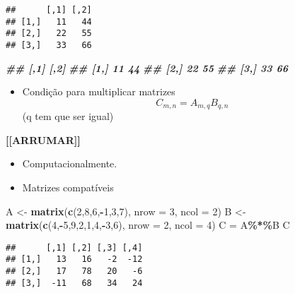 \documentclass[
]{article}
\newenvironment{Shaded}{\begin{snugshade}}{\end{snugshade}}
\newcommand{\AttributeTok}[1]{\textcolor[rgb]{0.13,0.29,0.53}{#1}}
\newcommand{\DecValTok}[1]{\textcolor[rgb]{0.00,0.00,0.81}{#1}}
\newcommand{\DocumentationTok}[1]{\textcolor[rgb]{0.56,0.35,0.01}{\textbf{\textit{#1}}}}
\newcommand{\FunctionTok}[1]{\textcolor[rgb]{0.13,0.29,0.53}{\textbf{#1}}}
\newcommand{\NormalTok}[1]{#1}
\newcommand{\OtherTok}[1]{\textcolor[rgb]{0.56,0.35,0.01}{#1}}
\newcommand{\SpecialCharTok}[1]{\textcolor[rgb]{0.81,0.36,0.00}{\textbf{#1}}}
\providecommand{\tightlist}{%
  \setlength{\itemsep}{0pt}\setlength{\parskip}{0pt}}
\begin{document}
\begin{verbatim}
##      [,1] [,2]
## [1,]   11   44
## [2,]   22   55
## [3,]   33   66
\end{verbatim}

\begin{Shaded}
\begin{Highlighting}[]
\DocumentationTok{\#\# [,1] [,2]}
\DocumentationTok{\#\# [1,] 11 44}
\DocumentationTok{\#\# [2,] 22 55}
\DocumentationTok{\#\# [3,] 33 66}
\end{Highlighting}
\end{Shaded}

\begin{itemize}
\tightlist
\item
  Condição para multiplicar matrizes \[
  C_{m, n} = A_{m,q} B_{q,n}
  \] (q tem que ser igual)
\end{itemize}

\textbf{{[}{[}ARRUMAR{]}{]}}

\begin{itemize}
\tightlist
\item
  Computacionalmente.
\item
  Matrizes compatíveis
\end{itemize}

\begin{Shaded}
\begin{Highlighting}[]
\NormalTok{A }\OtherTok{\textless{}{-}} \FunctionTok{matrix}\NormalTok{(}\FunctionTok{c}\NormalTok{(}\DecValTok{2}\NormalTok{,}\DecValTok{8}\NormalTok{,}\DecValTok{6}\NormalTok{,}\SpecialCharTok{{-}}\DecValTok{1}\NormalTok{,}\DecValTok{3}\NormalTok{,}\DecValTok{7}\NormalTok{),}
\AttributeTok{nrow =} \DecValTok{3}\NormalTok{, }\AttributeTok{ncol =} \DecValTok{2}\NormalTok{)}
\NormalTok{B }\OtherTok{\textless{}{-}} \FunctionTok{matrix}\NormalTok{(}\FunctionTok{c}\NormalTok{(}\DecValTok{4}\NormalTok{,}\SpecialCharTok{{-}}\DecValTok{5}\NormalTok{,}\DecValTok{9}\NormalTok{,}\DecValTok{2}\NormalTok{,}\DecValTok{1}\NormalTok{,}\DecValTok{4}\NormalTok{,}\SpecialCharTok{{-}}\DecValTok{3}\NormalTok{,}\DecValTok{6}\NormalTok{),}
\AttributeTok{nrow =} \DecValTok{2}\NormalTok{, }\AttributeTok{ncol =} \DecValTok{4}\NormalTok{)}
\NormalTok{C }\OtherTok{=}\NormalTok{ A}\SpecialCharTok{\%*\%}\NormalTok{B}
\NormalTok{C}
\end{Highlighting}
\end{Shaded}

\begin{verbatim}
##      [,1] [,2] [,3] [,4]
## [1,]   13   16   -2  -12
## [2,]   17   78   20   -6
## [3,]  -11   68   34   24
\end{verbatim}
\end{document}
